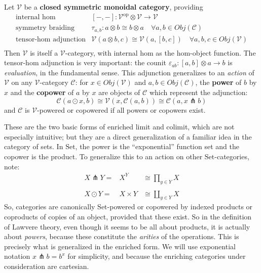 \documentclass[a4paper,UKenglish]{article}
\theoremstyle{definition}
\newcommand{\Set}{\mathrm{Set}}
\newcommand{\op}{\mathrm{op}}
\newcommand{\V}{\mathscr{V}}
\newcommand{\C}{\mathscr{C}}
\newcommand{\pfk}{\pitchfork}
\begin{document}
Let $\V$ be a \textbf{closed symmetric monoidal category}, providing
\[\begin{array}{rl}
\text{internal hom} & [-,-]:\V^\op\otimes \V \to \V\\
\text{symmetry braiding} & \tau_{a,b}:a\otimes b\cong b\otimes a \quad \forall a,b \in Obj(\C)\\
\text{tensor-hom adjunction} & \V(a\otimes b,c) \cong \V(a,[b,c]) \quad \forall a,b,c \in Obj(\V)\\
\end{array}\]
Then $\V$ is itself a $\V$-category, with internal hom as the hom-object function. The tensor-hom adjunction is very important: the counit $\varepsilon_{ab}: [a,b]\otimes a \to b$ is \textit{evaluation}, in the fundamental sense. This adjunction generalizes to an \textit{action} of $\V$ on any $\V$-category $\C$: for $x \in Obj(\V)$ and $a,b \in Obj(\C)$, the \textbf{power} of $b$ by $x$ and the \textbf{copower} of $a$ by $x$ are objects of $\C$ which represent the adjunction:
$$\C(a\odot x,b) \cong \V(x, \C(a,b)) \cong \C(a,x\pfk b)$$
and $\C$ is $\V$-powered or copowered if all powers or copowers exist.

These are the two basic forms of enriched limit and colimit, which are not especially intuitive; but they are a direct generalization of a familiar idea in the category of sets. In $\Set$, the power is the ``exponential'' function set and the copower is the product. To generalize this to an action on other $\Set$-categories, note:
\[\begin{array}{lcr}
	X \pfk Y = & X^Y & \cong \prod_{y\in Y}X\\
	\\
	X \odot Y = & X \times Y & \cong \coprod_{y\in Y}X
\end{array}\]
So, categories are canonically $\Set$-powered or copowered by indexed products or coproducts of copies of an object, provided that these exist. So in the definition of Lawvere theory, even though it seems to be all about products, it is actually about \textit{powers}, because these constitute the \textit{arities} of the operations. This is precisely what is generalized in the enriched form. We will use exponential notation $x\pfk b = b^x$ for simplicity, and because the enriching categories under consideration are cartesian.
\end{document}

